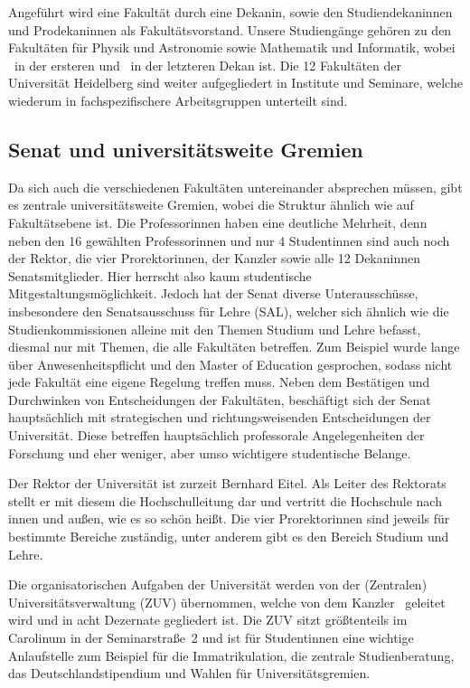 Angeführt wird eine Fakultät durch eine Dekanin, sowie den Studiendekaninnen und Prodekaninnen als Fakultätsvorstand. Unsere Studiengänge gehören zu den Fakultäten für Physik und Astronomie sowie Mathematik und Informatik, wobei \dekanphysik\ in der ersteren und \dekanmathe\ in der letzteren Dekan ist. Die 12 Fakultäten der Universität Heidelberg sind weiter aufgegliedert in Institute und Seminare, welche wiederum in fachspezifischere Arbeitsgruppen unterteilt sind.

\subsection{Senat und universitätsweite Gremien}
Da sich auch die verschiedenen Fakultäten untereinander absprechen müssen, gibt es zentrale universitätsweite Gremien, wobei die Struktur ähnlich wie auf Fakultätsebene ist. Die Professorinnen haben eine deutliche Mehrheit, denn neben den 16 gewählten Professorinnen und nur 4 Studentinnen sind auch noch der Rektor, die vier Prorektorinnen, der Kanzler sowie alle 12 Dekaninnen Senatsmitglieder. Hier herrscht also kaum studentische Mitgestaltungsmöglichkeit. Jedoch hat der Senat diverse Unterausschüsse, insbesondere den Senatsausschuss für Lehre (SAL), welcher sich ähnlich wie die Studienkommissionen alleine mit den Themen Studium und Lehre befasst, diesmal nur mit Themen, die alle Fakultäten betreffen. Zum Beispiel wurde lange über Anwesenheitspflicht und den Master of Ed\-u\-ca\-tion gesprochen, sodass nicht jede Fakultät eine eigene Regelung treffen muss. Neben dem Bestätigen und Durchwinken von Entscheidungen der Fakultäten, beschäftigt sich der Senat hauptsächlich mit strategischen und richtungsweisenden Entscheidungen der Universität.
Diese betreffen hauptsächlich professorale Angelegenheiten der Forschung und eher weniger, aber umso wichtigere studentische Belange.

Der Rektor der Universität ist zurzeit Bernhard Eitel. Als Leiter des Rektorats stellt er mit diesem die Hochschulleitung dar und vertritt die Hochschule nach innen und außen, wie es so schön heißt. Die vier Prorektorinnen sind jeweils für bestimmte Bereiche zuständig, unter anderem gibt es den Bereich Studium und Lehre.

Die organisatorischen Aufgaben der Universität werden von der (Zentralen) Universitätsverwaltung (ZUV) übernommen, welche von dem Kanzler \kanzler\ geleitet wird und in acht Dezernate gegliedert ist. Die ZUV sitzt größtenteils im Carolinum in der Seminarstraße~2 und ist für Studentinnen eine wichtige Anlaufstelle zum Beispiel für die Immatrikulation, die zentrale Studienberatung, das Deutschlandstipendium und Wahlen für Universitätsgremien.

